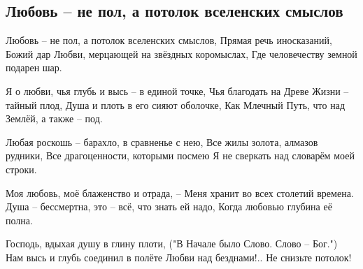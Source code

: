  
 
 
 
 
\subsection{Любовь – не пол, а потолок вселенских смыслов}

Любовь – не пол, а потолок вселенских смыслов,
Прямая речь иносказаний, Божий дар
Любви, мерцающей на звёздных коромыслах,
Где человечеству земной подарен шар.

Я о любви, чья глубь и высь – в единой точке,
Чья благодать на Древе Жизни – тайный плод,
Душа и плоть в его сияют оболочке,
Как Млечный Путь, что над Землёй, а также – под.

Любая роскошь – барахло, в сравненье с нею,
Все жилы золота, алмазов рудники,
Все драгоценности, которыми посмею
Я не сверкать над словарём моей строки.

Моя любовь, моё блаженство и отрада, –
Меня хранит во всех столетий времена.
Душа – бессмертна, это – всё, что знать ей надо,
Когда любовью глубина её полна.

Господь, вдыхая душу в глину плоти,
("В Начале было Слово. Слово – Бог.")
Нам высь и глубь соединил в полёте
Любви над безднами!.. Не снизьте потолок!

